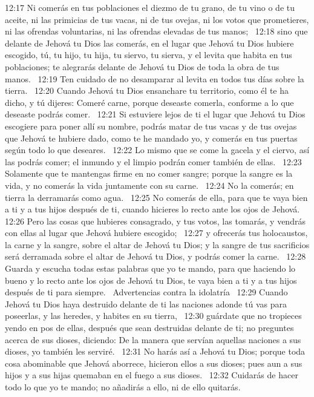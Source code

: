 12:17 Ni comerás en tus poblaciones el diezmo de tu grano, de tu vino o de tu aceite, ni las primicias de tus vacas, ni de tus ovejas, ni los votos que prometieres, ni las ofrendas voluntarias, ni las ofrendas elevadas de tus manos;  
12:18 sino que delante de Jehová tu Dios las comerás, en el lugar que Jehová tu Dios hubiere escogido, tú, tu hijo, tu hija, tu siervo, tu sierva, y el levita que habita en tus poblaciones; te alegrarás delante de Jehová tu Dios de toda la obra de tus manos.  
12:19 Ten cuidado de no desamparar al levita en todos tus días sobre la tierra.  
12:20 Cuando Jehová tu Dios ensanchare tu territorio, como él te ha dicho, y tú dijeres: Comeré carne, porque deseaste comerla, conforme a lo que deseaste podrás comer.  
12:21 Si estuviere lejos de ti el lugar que Jehová tu Dios escogiere para poner allí su nombre, podrás matar de tus vacas y de tus ovejas que Jehová te hubiere dado, como te he mandado yo, y comerás en tus puertas según todo lo que deseares.  
12:22 Lo mismo que se come la gacela y el ciervo, así las podrás comer; el inmundo y el limpio podrán comer también de ellas.  
12:23 Solamente que te mantengas firme en no comer sangre; porque la sangre es la vida, y no comerás la vida juntamente con su carne.  
12:24 No la comerás; en tierra la derramarás como agua.  
12:25 No comerás de ella, para que te vaya bien a ti y a tus hijos después de ti, cuando hicieres lo recto ante los ojos de Jehová.  
12:26 Pero las cosas que hubieres consagrado, y tus votos, las tomarás, y vendrás con ellas al lugar que Jehová hubiere escogido;  
12:27 y ofrecerás tus holocaustos, la carne y la sangre, sobre el altar de Jehová tu Dios; y la sangre de tus sacrificios será derramada sobre el altar de Jehová tu Dios, y podrás comer la carne.  
12:28 Guarda y escucha todas estas palabras que yo te mando, para que haciendo lo bueno y lo recto ante los ojos de Jehová tu Dios, te vaya bien a ti y a tus hijos después de ti para siempre.  
Advertencias contra la idolatría  
12:29 Cuando Jehová tu Dios haya destruido delante de ti las naciones adonde tú vas para poseerlas, y las heredes, y habites en su tierra,  
12:30 guárdate que no tropieces yendo en pos de ellas, después que sean destruidas delante de ti; no preguntes acerca de sus dioses, diciendo: De la manera que servían aquellas naciones a sus dioses, yo también les serviré.  
12:31 No harás así a Jehová tu Dios; porque toda cosa abominable que Jehová aborrece, hicieron ellos a sus dioses; pues aun a sus hijos y a sus hijas quemaban en el fuego a sus dioses.  
12:32 Cuidarás de hacer todo lo que yo te mando; no añadirás a ello, ni de ello quitarás.  

